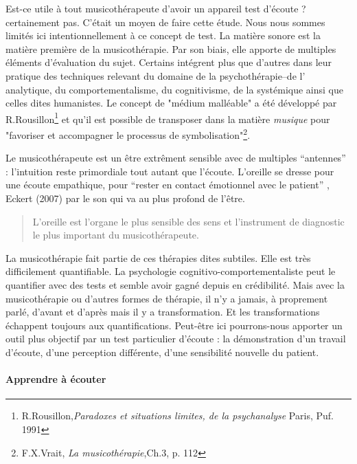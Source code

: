         Est-ce utile à tout musicothérapeute d'avoir un appareil test d'écoute ? certainement pas. C'était un moyen de faire cette étude.
     Nous nous sommes  limités ici intentionnellement
     à ce concept de test.
 La matière sonore est la matière première de la  musicothérapie. 
 Par son biais, elle  apporte de multiples éléments d'évaluation du
 sujet. 
 Certains  intégrent plus que d'autres dans leur pratique des techniques relevant du domaine de la psychothérapie--de l' analytique, 
  du comportementalisme, du cognitivisme, de la  systémique ainsi que
  celles dites humanistes.  Le concept de "médium malléable" a été
  développé par  R.Rousillon\footnote{R.Rousillon,\textit{Paradoxes et situations limites,  
  		de la psychanalyse} Paris, Puf. 1991} 
  et qu'il est possible de transposer dans la matière \textit{musique} 
  pour "favoriser et accompagner le processus 
  de symbolisation"\footnote{F.X.Vrait, \textit{La musicothérapie},Ch.3, p. 112}.

 Le musicothérapeute est un être extrêment sensible avec de multiples
 ``antennes'' : l'intuition reste primordiale tout autant que  
 l'écoute. L'oreille se dresse pour une écoute empathique, pour ``rester en contact émotionnel  
 avec le patient'' , Eckert (2007) par le son qui va au plus profond de
 l'être.

 
\begin{quotation}
	L'oreille est l'organe le plus sensible des sens 
et l'instrument de diagnostic  le plus important du
musicothérapeute.\autocite{seminar_zuerich}
 	
\end{quotation}
La musicothérapie fait partie de ces thérapies dites subtiles. Elle
est très difficilement quantifiable. La
psychologie cognitivo-comportementaliste peut le quantifier avec des tests et semble avoir gagné depuis en crédibilité. Mais avec la musicothérapie ou d'autres formes de thérapie, il n'y a
jamais, à proprement parlé, d'avant et d'après mais il y a transformation.
Et les transformations échappent toujours aux quantifications. Peut-être
ici pourrons-nous apporter un outil plus objectif par un test particulier
d'écoute : la démonstration d'un travail d'écoute, d'une perception
différente, d'une sensibilité nouvelle du patient. 



\paragraph{Apprendre à écouter}

